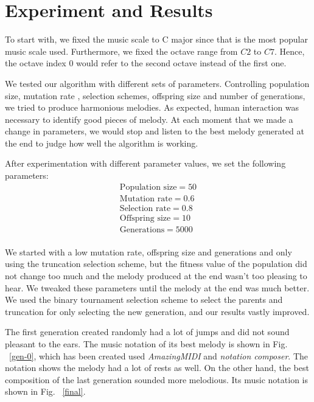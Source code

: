 \documentclass[conference]{IEEEtran}
\begin{document}
\section{Experiment and Results}
To start with, we fixed the music scale to C major since that is the most popular music scale used. Furthermore, we fixed the octave range from $C2$ to $C7$. Hence, the octave index 0 would refer to the second octave instead of the first one.

We tested our algorithm with different sets of parameters. Controlling population size, mutation rate , selection schemes, offspring size and number of generations, we tried to produce harmonious melodies. As expected, human interaction was necessary to identify good pieces of melody. At each moment that we made a change in parameters, we would stop and listen to the best melody generated at the end to judge how well the algorithm is working.

After experimentation with different parameter values, we set the following parameters:
\begin{align*}
\text{Population size}=50\\
\text{Mutation rate} = 0.6\\
\text{Selection rate} = 0.8\\
\text{Offspring size}= 10\\
\text{Generations}= 5000\\
\end{align*}

We started with a low mutation rate, offspring size and generations and only using the truncation selection scheme, but the fitness value of the population did not change too much and the melody produced at the end wasn't too pleasing to hear. We tweaked these parameters until the melody at the end was much better. We used the binary tournament selection scheme to select the parents and truncation for only selecting the new generation, and our results vastly improved.

The first generation created randomly had a lot of jumps and did not sound pleasant to the ears. The music notation of its best melody is shown in Fig. ~\ref{gen-0}, which has been created used \textit{AmazingMIDI} and \textit{notation composer}. The notation shows the melody had a lot of rests as well. On the other hand, the best composition of the last generation sounded more melodious. Its music notation is shown in Fig. ~\ref{final}.
\end{document}
